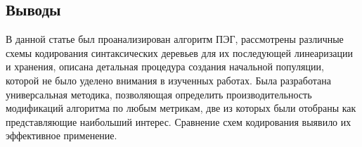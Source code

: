 

\subsection{Выводы}

В данной статье был проанализирован алгоритм ПЭГ, рассмотрены различные схемы кодирования синтаксических деревьев для их последующей линеаризации и хранения, описана детальная процедура создания начальной популяции, которой не было уделено внимания в изученных работах. Была разработана универсальная методика, позволяющая определить производительность модификаций алгоритма по любым метрикам, две из которых были отобраны как представляющие наибольший интерес. Сравнение схем кодирования выявило их эффективное применение.

